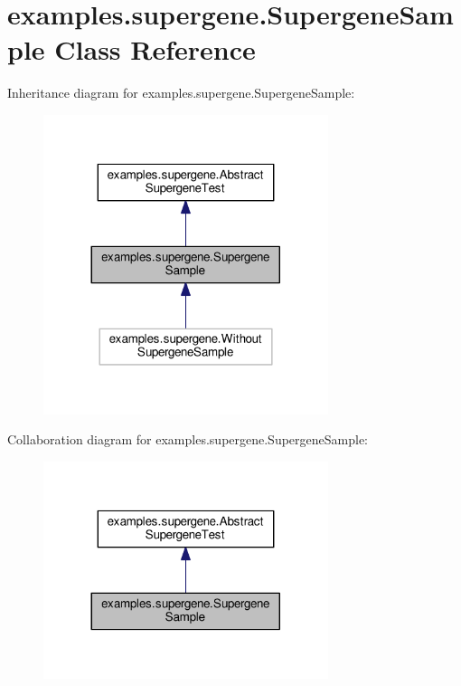 \hypertarget{classexamples_1_1supergene_1_1_supergene_sample}{\section{examples.\-supergene.\-Supergene\-Sample Class Reference}
\label{classexamples_1_1supergene_1_1_supergene_sample}
}


Inheritance diagram for examples.\-supergene.\-Supergene\-Sample\-:
\nopagebreak
\begin{figure}[H]
\begin{center}
\leavevmode
\includegraphics[width=236pt]{classexamples_1_1supergene_1_1_supergene_sample__inherit__graph}
\end{center}
\end{figure}


Collaboration diagram for examples.\-supergene.\-Supergene\-Sample\-:
\nopagebreak
\begin{figure}[H]
\begin{center}
\leavevmode
\includegraphics[width=236pt]{classexamples_1_1supergene_1_1_supergene_sample__coll__graph}
\end{center}
\end{figure}
